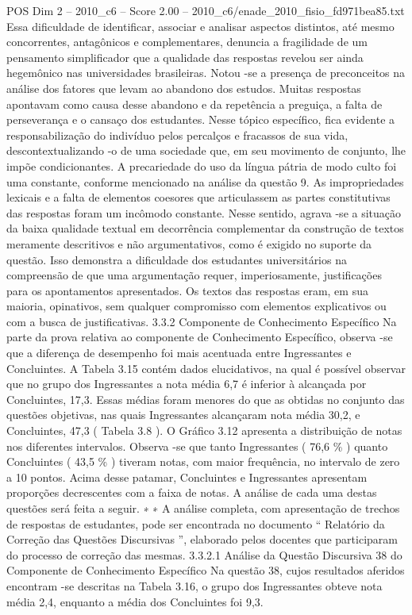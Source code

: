 \begin{textsample}{POS Dim 2 – 2010\_c6 – Score 2.00 – 2010\_c6/enade\_2010\_fisio\_fd971bea85.txt}
Essa dificuldade de identificar, associar e analisar aspectos distintos, até mesmo concorrentes, antagônicos e complementares, denuncia a fragilidade de um pensamento simplificador que a qualidade das respostas revelou ser ainda hegemônico nas universidades brasileiras.
Notou -se a presença de preconceitos na análise dos fatores que levam ao abandono dos estudos.
Muitas respostas apontavam como causa desse abandono e da repetência a preguiça, a falta de perseverança e o cansaço dos estudantes.
Nesse tópico específico, fica evidente a responsabilização do indivíduo pelos percalços e fracassos de sua vida, descontextualizando -o de uma sociedade que, em seu movimento de conjunto, lhe impõe condicionantes.
A precariedade do uso da língua pátria de modo culto foi uma constante, conforme mencionado na análise da questão 9.
As impropriedades lexicais e a falta de elementos coesores que articulassem as partes constitutivas das respostas foram um incômodo constante.
Nesse sentido, agrava -se a situação da baixa qualidade textual em decorrência complementar da construção de textos meramente descritivos e não argumentativos, como é exigido no suporte da questão.
Isso demonstra a dificuldade dos estudantes universitários na compreensão de que uma argumentação requer, imperiosamente, justificações para os apontamentos apresentados.
Os textos das respostas eram, em sua maioria, opinativos, sem qualquer compromisso com elementos explicativos ou com a busca de justificativas. 3.3.2 Componente de Conhecimento Específico Na parte da prova relativa ao componente de Conhecimento Específico, observa -se que a diferença de desempenho foi mais acentuada entre Ingressantes e Concluintes.
A Tabela 3.15 contém dados elucidativos, na qual é possível observar que no grupo dos Ingressantes a nota média 6,7 é inferior à alcançada por Concluintes, 17,3.
Essas médias foram menores do que as obtidas no conjunto das questões objetivas, nas quais Ingressantes alcançaram nota média 30,2, e Concluintes, 47,3 ( Tabela 3.8 ).
O Gráfico 3.12 apresenta a distribuição de notas nos diferentes intervalos.
Observa -se que tanto Ingressantes ( 76,6 \% ) quanto Concluintes ( 43,5 \% ) tiveram notas, com maior frequência, no intervalo de zero a 10 pontos.
Acima desse patamar, Concluintes e Ingressantes apresentam proporções decrescentes com a faixa de notas.
A análise de cada uma destas questões será feita a seguir. ∗ ∗ A análise completa, com apresentação de trechos de respostas de estudantes, pode ser encontrada no documento “ Relatório da Correção das Questões Discursivas ”, elaborado pelos docentes que participaram do processo de correção das mesmas. 3.3.2.1 Análise da Questão Discursiva 38 do Componente de Conhecimento Específico Na questão 38, cujos resultados aferidos encontram -se descritas na Tabela 3.16, o grupo dos Ingressantes obteve nota média 2,4, enquanto a média dos Concluintes foi 9,3.

\end{textsample}

